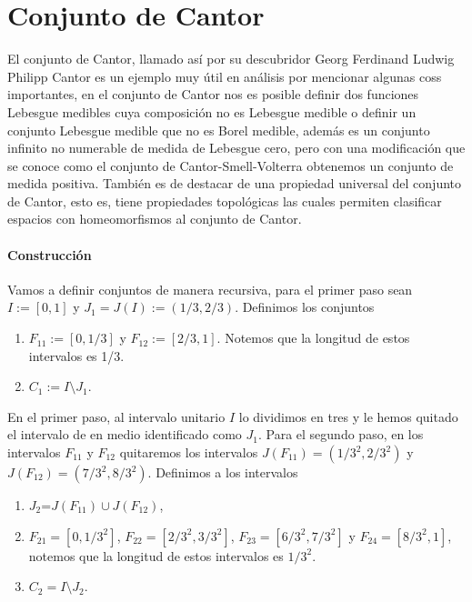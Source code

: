 \documentclass{subfiles}
\begin{document}

\chapter{Conjunto de Cantor}

El conjunto de Cantor, llamado así por su descubridor Georg Ferdinand Ludwig Philipp Cantor es un ejemplo muy útil en análisis por mencionar algunas coss importantes, en el conjunto de Cantor nos es posible definir dos funciones Lebesgue medibles cuya composición no es Lebesgue medible o definir un conjunto Lebesgue medible que no es Borel medible, además es un conjunto infinito no numerable de medida de Lebesgue cero, pero con una modificación que se conoce como el conjunto de Cantor-Smell-Volterra obtenemos un conjunto de medida positiva. También es de destacar de una propiedad universal del conjunto de Cantor, esto es, tiene propiedades topológicas las cuales permiten clasificar espacios con homeomorfismos al conjunto de Cantor. 

\subsubsection{Construcción}
Vamos a definir conjuntos de manera recursiva, para el primer paso  sean $I:=[0,1]$ y $J_1=J(I):=(1/3,2/3)$. Definimos los conjuntos

\begin{enumerate}
\item $F_{11} := [0,1/3]$ y $F_{12} := [2/3,1]$. Notemos que la longitud de estos intervalos es 1/3.
\item $C_1 := I \setminus J_1$. 
\end{enumerate} 

En el primer paso, al intervalo unitario $I$ lo dividimos en tres y  le hemos quitado el intervalo de en medio identificado como $J_1$.
Para el segundo paso, en los intervalos $F_{11}$ y $F_{12}$ quitaremos los intervalos $J(F_{11})=(1/3^2,2/3^2)$ y $J(F_{12})=(7/3^2,8/3^2)$. Definimos a los intervalos

\begin{enumerate}
\item $J_2$=$J(F_{11}) \cup J(F_{12})$,
\item $F_{21}=[0,1/3^2]$,  $F_{22}=[2/3^2,3/3^2]$, $F_{23}=[6/3^2,7/3^2]$ y $F_{24}=[8/3^2,1]$, notemos que la longitud de estos intervalos es $1/3^2$.
\item $C_2=I \setminus J_2$. 
\end{enumerate}
\end{document}
